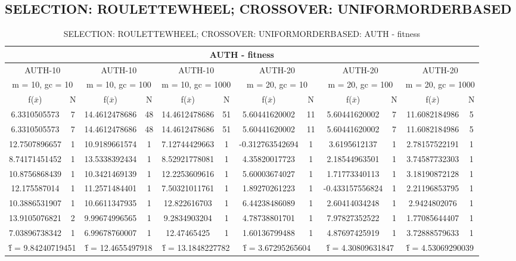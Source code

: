 \subsection{SELECTION: ROULETTEWHEEL; CROSSOVER: UNIFORMORDERBASED}
\begin{table}[H]
	\centering
	\caption{SELECTION: ROULETTEWHEEL; CROSSOVER: UNIFORMORDERBASED: AUTH - fitness}
	\begin{adjustbox}{width=1\textwidth}
		\begin{tabular}{ |c|c||c|c||c|c||c|c||c|c||c|c| }
			\hline
			\multicolumn{12}{|c|}{AUTH - fitness} \\
			\hline
			\multicolumn{2}{|c||}{AUTH-10} & \multicolumn{2}{c||}{AUTH-10} & \multicolumn{2}{c||}{AUTH-10} & \multicolumn{2}{c||}{AUTH-20} & \multicolumn{2}{c||}{AUTH-20} & \multicolumn{2}{c|}{AUTH-20}\\
			\hline
			\multicolumn{2}{|c||}{m = 10, gc = 10} & \multicolumn{2}{c||}{m = 10, gc = 100} & \multicolumn{2}{c||}{m = 10, gc = 1000} & \multicolumn{2}{c||}{m = 20, gc = 10} & \multicolumn{2}{c||}{m = 20, gc = 100} & \multicolumn{2}{c|}{m = 20, gc = 1000}\\
			\hline
			f($\bar{x}$) & N & f($\bar{x}$) & N & f($\bar{x}$) & N & f($\bar{x}$) & N & f($\bar{x}$) & N & f($\bar{x}$) & N\\
			\hline
			\hline
			6.3310505573 & 7 & 14.4612478686 & 48 & 14.4612478686 & 51 & 5.60441620002 & 11 & 5.60441620002 & 7 & 11.6082184986 & 5\\
			\hline
			6.3310505573 & 7 & 14.4612478686 & 48 & 14.4612478686 & 51 & 5.60441620002 & 11 & 5.60441620002 & 7 & 11.6082184986 & 5\\
			12.7507896657 & 1 & 10.9189661574 & 1 & 7.12744429663 & 1 & -0.312763542694 & 1 & 3.6195612137 & 1 & 2.78157522191 & 1\\
			8.74171451452 & 1 & 13.5338392434 & 1 & 8.52921778081 & 1 & 4.35820017723 & 1 & 2.18544963501 & 1 & 3.74587732303 & 1\\
			10.8756868439 & 1 & 10.3421469139 & 1 & 12.2253609616 & 1 & 5.60003674027 & 1 & 1.71773340113 & 1 & 3.18190872128 & 1\\
			12.175587014 & 1 & 11.2571484401 & 1 & 7.50321011761 & 1 & 1.89270261223 & 1 & -0.433157556824 & 1 & 2.21196853795 & 1\\
			10.3886531907 & 1 & 10.6611347935 & 1 & 12.822616703 & 1 & 6.44238486089 & 1 & 2.60414034248 & 1 & 2.9424802076 & 1\\
			13.9105076821 & 2 & 9.99674996565 & 1 & 9.2834903204 & 1 & 4.78738801701 & 1 & 7.97827352522 & 1 & 1.77085644407 & 1\\
			7.03896738342 & 1 & 6.99678760007 & 1 & 12.47465425 & 1 & 1.60136799488 & 1 & 4.87697425919 & 1 & 3.72888579633 & 1\\
			\hline
			\multicolumn{2}{|c||}{\^{f} = 9.84240719451} & \multicolumn{2}{c||}{\^{f} = 12.4655497918} & \multicolumn{2}{c||}{\^{f} = 13.1848227782} & \multicolumn{2}{c||}{\^{f} = 3.67295265604} & \multicolumn{2}{c||}{\^{f} = 4.30809631847} & \multicolumn{2}{c|}{\^{f} = 4.53069290039}\\
			\hline
		\end{tabular}
	\end{adjustbox}
\end{table}
